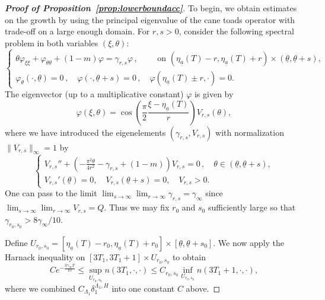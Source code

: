 \documentclass[11pt]{article}    %
\begin{document}
\begin{proof}[{\bf Proof of Proposition~\ref{prop:lowerboundacc}}]
To begin, we obtain estimates on the growth by using the principal eigenvalue of the cane toads operator with trade-off on a large enough domain.  For $r,s>0$, consider the following spectral problem in both variables $(\xi,\theta)$:
\begin{equation*}
\begin{cases}
\theta \varphi_{\xi\xi}   +  \varphi_{\theta\theta}  + (1-m) \varphi   = \gamma_{r,s} \varphi \,, \qquad \text{ on } (\eta_{\underline a}(T)-r,\eta_{\underline a}(T)+r) \times (\underline\theta, \underline\theta + s),\\
\varphi_\theta (\cdot,\underline\theta) = 0\,, \quad \varphi (\cdot,\underline\theta + s) = 0\,, \quad \varphi(\eta_{\underline a}(T)\pm r,\cdot) = 0.
\end{cases}
\end{equation*}
The eigenvector (up to a multiplicative constant) $\varphi$ is given by 
\begin{equation*}
\varphi(\xi,\theta)= \cos\left( \frac{\pi}{2}\frac{\xi-\eta_{\underline a}(T)}{r}\right) V_{r,s}(\theta),
\end{equation*}
where we have introduced the eigenelements $(\gamma_{r,s},V_{r,s})$ with normalization $\|V_{r,s}\|_\infty = 1$ by
\begin{equation*}
\begin{cases}
V_{r,s}''  + \left( - \frac{\pi^2 \theta}{4r^2} - \gamma_{r,s} + (1-m) \right) V_{r,s}   = 0 \,, \quad \theta \in (\underline\theta, \underline\theta + s),\\
V_{r,s}'(\underline\theta) = 0, \quad V_{r,s}(\underline\theta + s) = 0, \quad V_{r,s} > 0.
\end{cases}
\end{equation*}
One can pass to the limit $\lim_{s\to\infty}\lim_{r\to\infty} \gamma_{r,s} = \gamma_\infty$ since $\lim_{s\to\infty}\lim_{r\to\infty} V_{r,s} = Q$.  Thus we may fix $r_0$ and $s_0$ sufficiently large so that $\gamma_{r_0,s_0} > 8\gamma_\infty/10$.

Define $U_{r_0,s_0} = [\eta_{\underline a}(T)-r_0,\eta_{\underline a}(T)+r_0] \times [\underline\theta, \underline\theta + s_0]$.  We now apply the Harnack inequality on $[3T_1, 3T_1 + 1] \times U_{r_0,s_0}$ to obtain
\begin{equation}\label{eq:n_lower_bound_harnack}
	C e^{- \frac{3\gamma_\infty T}{10}}
		\leq \sup_{U_{r_0,s_0}} n(3T_1, \cdot, \cdot)
		\leq C_{r_0,s_0} \inf_{U_{r_0,s_0}} n(3T_1 + 1, \cdot, \cdot),
\end{equation}
where we combined $C_{\Lambda_1} \delta_1^{\Lambda_1,H}$ into one constant $C$ above.


\end{proof}
\end{document}

